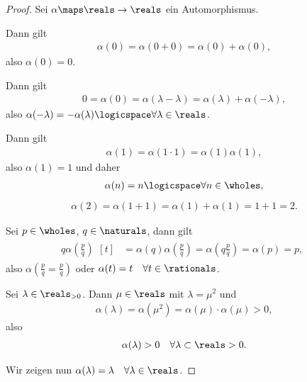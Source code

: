 \begin{proof}
    Sei \( \alpha\maps \reals\to \reals \) ein Automorphismus.
    \begin{proofenumerate}
        \item Dann gilt
        \begin{align*}
            \alpha(0)=\alpha(0+0)=\alpha(0)+\alpha(0),
        \end{align*}
        also \( \alpha(0)=0 \).
        \item Dann gilt
        \begin{align*}
            0=\alpha(0)=\alpha(\lambda-\lambda)=\alpha(\lambda)+\alpha(-\lambda),
        \end{align*}
        also \( \alpha(-\lambda)=-\alpha(\lambda)\logicspace \forall \lambda\in \reals \).
        \item Dann gilt
        \begin{align*}
            \alpha(1)=\alpha(1\cdot 1)=\alpha(1)\alpha(1),
        \end{align*}
        also \( \alpha(1)=1 \) und daher
        \begin{align*}
            \alpha(n)=n\logicspace \forall n\in \wholes,
        \end{align*}
        \zb
        \begin{align*}
            \alpha(2)=\alpha(1+1)=\alpha(1)+\alpha(1)=1+1=2.
        \end{align*}
        \item Sei \( p\in \wholes \), \( q\in \naturals \), dann gilt
        \begin{align*}
            q\alpha\left( \frac{p}{q} \right)\begin{aligned}[t]
                &=\alpha(q)\alpha\left( \frac{p}{q} \right)=\alpha\left( q\frac{p}{q} \right)=\alpha(p)=p,
            \end{aligned}
        \end{align*}
        also \( \alpha\left( \frac{p}{q}=\frac{p}{q} \right) \) oder \( \alpha(t)=t\quad \forall t\in \rationals \).
        \item Sei \( \lambda\in \reals_{>0} \). Dann \texists  \( \mu\in\reals \) mit \( \lambda=\mu^2 \) und
        \begin{align*}
            \alpha(\lambda)=\alpha(\mu^2)=\alpha(\mu)\cdot \alpha(\mu)>0,
        \end{align*}
        also
        \begin{align*}
            \alpha(\lambda)>0\quad \forall \lambda\subset \reals>0.
        \end{align*}
    \end{proofenumerate}
    Wir zeigen nun \( \alpha(\lambda)=\lambda\quad \forall \lambda\in \reals \).


\end{proof}
